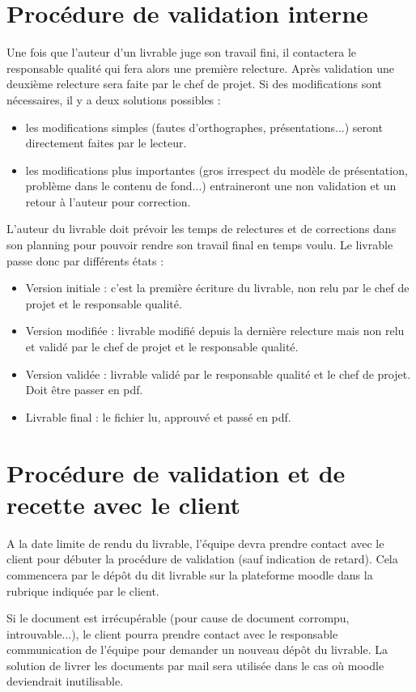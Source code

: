 \section{Procédure de validation interne}
  Une fois que l'auteur d'un livrable juge son travail fini, il contactera le responsable qualité qui fera alors une première relecture. Après validation une deuxième relecture sera faite par le chef de projet.
Si des modifications sont nécessaires, il y a deux solutions possibles  :
\begin{itemize}
    \item les modifications simples (fautes d'orthographes, présentations...) seront directement faites par le lecteur.
    \item les modifications plus importantes (gros irrespect du modèle de présentation, problème dans le contenu de fond...) entraineront une non validation et un retour à  l'auteur pour correction.
\end{itemize}
    L'auteur du livrable doit prévoir les temps de relectures et de corrections dans son planning pour pouvoir rendre son travail final en temps voulu.
    Le livrable passe donc par différents états  :
\begin{itemize}
    \item Version initiale  : c'est la première écriture du livrable, non relu par le chef de projet et le responsable qualité.
    \item Version modifiée  : livrable modifié depuis la dernière relecture mais non relu et validé par le chef de projet et le responsable qualité.
    \item Version validée  : livrable validé par le responsable qualité et le chef de projet. Doit être passer en pdf.
    \item Livrable final  : le fichier lu, approuvé et passé en pdf.
\end{itemize}

\section{Procédure de validation et de recette avec le client}
    A la date limite de rendu du livrable, l'équipe devra prendre contact avec le client pour débuter la procédure de validation (sauf indication de retard). Cela commencera par le dépôt du dit livrable sur la plateforme moodle dans la rubrique indiquée par le client.

    Si le document est irrécupérable (pour cause de document corrompu, introuvable...), le client pourra prendre contact avec le responsable communication de l'équipe pour demander un nouveau dépôt du livrable. La solution de livrer les documents par mail sera utilisée dans le cas où moodle deviendrait inutilisable.

